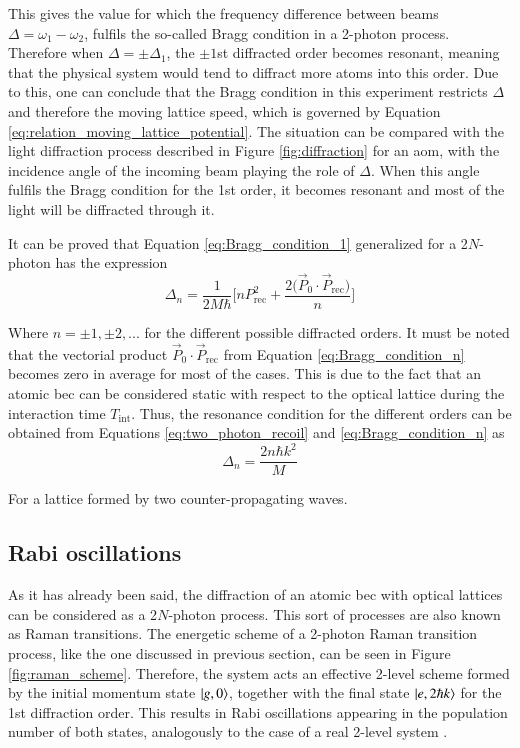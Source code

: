 This gives the value for which the frequency difference between beams $\Delta = \omega_1-\omega_2$, fulfils the so-called Bragg condition in a 2-photon process. Therefore when $\Delta = \pm\Delta_1$, the $\pm1$st diffracted order becomes resonant, meaning that the physical system would tend to diffract more atoms into this order. Due to this, one can conclude that the Bragg condition in this experiment restricts $\Delta$ and therefore the moving lattice speed, which is governed by Equation \eqref{eq:relation_moving_lattice_potential}. The situation can be compared with the light diffraction process described in Figure \ref{fig:diffraction} for an \ac{aom}, with the incidence angle of the incoming beam playing the role of $\Delta$. When this angle fulfils the Bragg condition for the 1st order, it becomes resonant and most of the light will be diffracted through it. 

It can be proved that Equation \eqref{eq:Bragg_condition_1} generalized for a 2$N$-photon has the expression \cite{Kozuma1999}
\begin{equation}\label{eq:Bragg_condition_n}
	\Delta_n = \frac{1}{2M\hbar} \Bigg[n P_{\text{rec}}^2 + \frac{2\big(\vec{P}_0 \cdot \vec{P}_{\text{rec}}\big)}{n}\Bigg]
\end{equation}

Where $n=\pm1, \pm2, \text{...}$ for the different possible diffracted orders. It must be noted that the vectorial product $\vec{P}_0 \cdot \vec{P}_{\text{rec}}$ from Equation \eqref{eq:Bragg_condition_n} becomes zero in average for most of the cases. This is due to the fact that an atomic \ac{bec} can be considered static with respect to the optical lattice during the interaction time $T_{\text{int}}$. Thus, the resonance condition for the different orders can be obtained from Equations \eqref{eq:two_photon_recoil} and \eqref{eq:Bragg_condition_n} as
\begin{equation}\label{eq:Bragg_condition}
	\Delta_n = \frac{2n\hbar k^2}{M}
\end{equation}

For a lattice formed by two counter-propagating waves.

\subsection{Rabi oscillations}

As it has already been said, the diffraction of an atomic \ac{bec} with optical lattices can be considered as a 2$N$-photon process. This sort of processes are also known as Raman transitions. The energetic scheme of a 2-photon Raman transition process, like the one discussed in previous section, can be seen in Figure \ref{fig:raman_scheme}. Therefore, the system acts an effective 2-level scheme formed by the initial momentum state $\ket{g, 0}$, together with the final state $\ket{e, 2\hbar k}$ for the 1st diffraction order. This results in Rabi oscillations appearing in the population number of both states, analogously to the case of a real 2-level system \cite{Foot2005}. 

